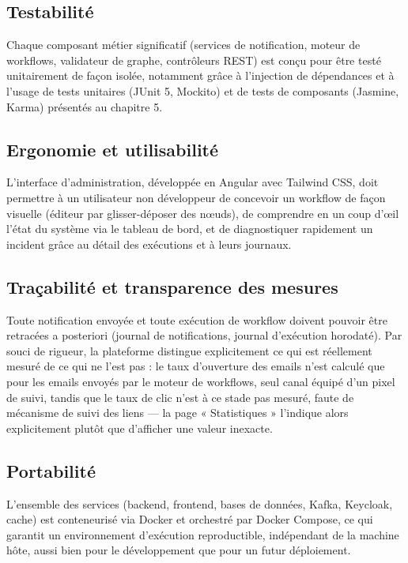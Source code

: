 \documentclass[12pt,a4paper]{report}
\begin{document}
\subsection{Testabilité}

Chaque composant métier significatif (services de notification, moteur de workflows, validateur de graphe, contrôleurs REST) est conçu pour être testé unitairement de façon isolée, notamment grâce à l'injection de dépendances et à l'usage de tests unitaires (JUnit 5, Mockito) et de tests de composants (Jasmine, Karma) présentés au chapitre 5.

\subsection{Ergonomie et utilisabilité}

L'interface d'administration, développée en Angular avec Tailwind CSS, doit permettre à un utilisateur non développeur de concevoir un workflow de façon visuelle (éditeur par glisser-déposer des n\oe uds), de comprendre en un coup d'\oe il l'état du système via le tableau de bord, et de diagnostiquer rapidement un incident grâce au détail des exécutions et à leurs journaux.

\subsection{Traçabilité et transparence des mesures}

Toute notification envoyée et toute exécution de workflow doivent pouvoir être retracées a posteriori (journal de notifications, journal d'exécution horodaté). Par souci de rigueur, la plateforme distingue explicitement ce qui est réellement mesuré de ce qui ne l'est pas : le taux d'ouverture des emails n'est calculé que pour les emails envoyés par le moteur de workflows, seul canal équipé d'un pixel de suivi, tandis que le taux de clic n'est à ce stade pas mesuré, faute de mécanisme de suivi des liens --- la page « Statistiques » l'indique alors explicitement plutôt que d'afficher une valeur inexacte.

\subsection{Portabilité}

L'ensemble des services (backend, frontend, bases de données, Kafka, Keycloak, cache) est conteneurisé via Docker et orchestré par Docker Compose, ce qui garantit un environnement d'exécution reproductible, indépendant de la machine hôte, aussi bien pour le développement que pour un futur déploiement.
\end{document}
